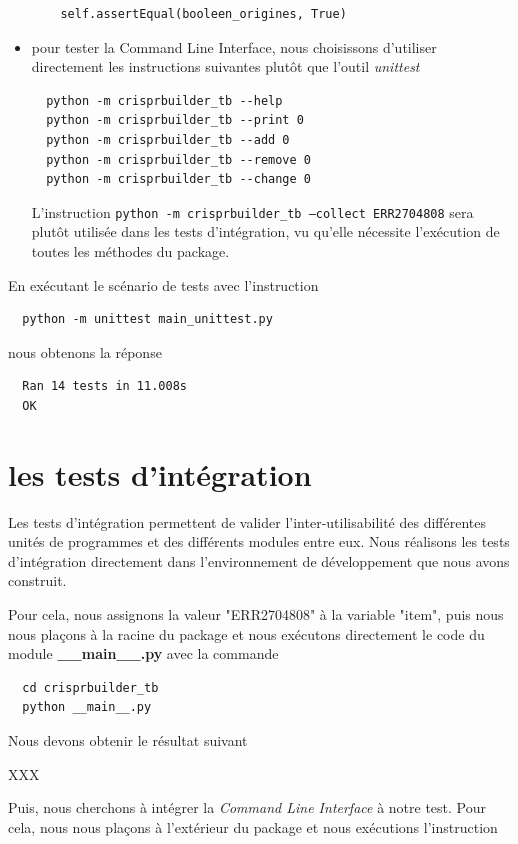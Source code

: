 \documentclass[twoside,a4paper,11pt,frenchb,openany]{report}
\begin{document}
\begin{itemize}
\begin{verbatim}
    self.assertEqual(booleen_origines, True)
\end{verbatim}
\item pour tester la Command Line Interface, nous choisissons d'utiliser directement les instructions suivantes plutôt que l'outil \textit{unittest}
\begin{verbatim}
  python -m crisprbuilder_tb --help
  python -m crisprbuilder_tb --print 0
  python -m crisprbuilder_tb --add 0
  python -m crisprbuilder_tb --remove 0
  python -m crisprbuilder_tb --change 0
\end{verbatim}
L'instruction \texttt{python -m crisprbuilder\_tb --collect ERR2704808} sera plutôt utilisée dans les tests d'intégration, vu qu'elle nécessite l'exécution de toutes les méthodes du package.
\end{itemize}

En exécutant le scénario de tests avec l'instruction

\begin{verbatim}
  python -m unittest main_unittest.py
\end{verbatim}

nous obtenons la réponse

\begin{verbatim}
  Ran 14 tests in 11.008s
  OK
\end{verbatim}


\section{les tests d'intégration}

Les tests d'intégration permettent de valider l'inter-utilisabilité des différentes unités de programmes  et des différents modules entre eux. Nous réalisons les tests d'intégration directement dans l'environnement de développement que nous avons construit.

Pour cela, nous assignons la valeur "ERR2704808" à la variable "item", puis nous nous plaçons à la racine du package et nous exécutons directement le code du module \textbf{\_\_main\_\_.py} avec la commande 

\begin{verbatim}
  cd crisprbuilder_tb
  python __main__.py
\end{verbatim}

Nous devons obtenir le résultat suivant 

XXX

Puis, nous cherchons à intégrer la \textit{Command Line Interface} à notre test. Pour cela, nous nous plaçons à l'extérieur du package et nous exécutions l'instruction
\end{document}
